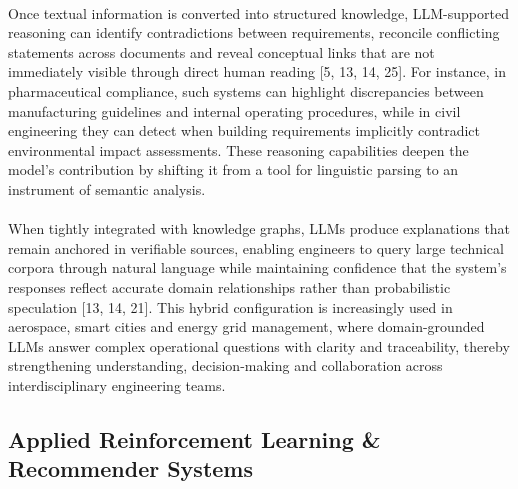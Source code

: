         \paragraph{}
        Once textual information is converted into structured knowledge, LLM-supported reasoning can identify contradictions between requirements, reconcile conflicting statements across documents and reveal conceptual links that are not immediately visible through direct human reading [5, 13, 14, 25]. For instance, in pharmaceutical compliance, such systems can highlight discrepancies between manufacturing guidelines and internal operating procedures, while in civil engineering they can detect when building requirements implicitly contradict environmental impact assessments. These reasoning capabilities deepen the model’s contribution by shifting it from a tool for linguistic parsing to an instrument of semantic analysis.

        \paragraph{}
        When tightly integrated with knowledge graphs, LLMs produce explanations that remain anchored in verifiable sources, enabling engineers to query large technical corpora through natural language while maintaining confidence that the system’s responses reflect accurate domain relationships rather than probabilistic speculation [13, 14, 21]. This hybrid configuration is increasingly used in aerospace, smart cities and energy grid management, where domain-grounded LLMs answer complex operational questions with clarity and traceability, thereby strengthening understanding, decision-making and collaboration across interdisciplinary engineering teams.

    \subsection{Applied Reinforcement Learning \& Recommender Systems}
